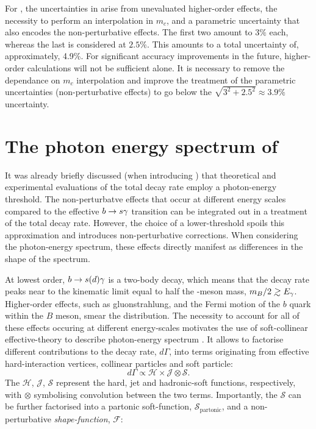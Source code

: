 For \BtoXsgamma, the uncertainties in  arise from unevaluated higher-order effects, the necessity to perform an interpolation in $m_c$, and a parametric uncertainty that also encodes the non-perturbative effects.
The first two amount to $3\%$ each, whereas the last is considered at $2.5\%$. 
This amounts to a total uncertainty of, approximately, 4.9\%.
For significant accuracy improvements in the future, higher-order calculations will not be sufficient alone.
It is necessary to remove the dependance on $m_c$ interpolation and improve the treatment of the parametric uncertainties (non-perturbative effects) to go below the $\sqrt{3^2+2.5^2}\approx3.9\%$ uncertainty.

\section{The photon energy spectrum of \texorpdfstring{\BtoXsdgamma}{B->Xsg}}\label{sec:btosgamma_spectrum_theory}

It was already briefly discussed (when introducing ) that theoretical and experimental evaluations of the total \BtoXsgamma decay rate employ a photon-energy threshold.
The non-perturbatve effects that occur at different energy scales compared to the effective $b\rightarrow s\gamma$ transition can be integrated out in a treatment of the total decay rate.
However, the choice of a lower-threshold spoils this approximation and introduces non-perturbative corrections.
When considering the photon-energy spectrum, these effects directly manifest as differences in the shape of the spectrum.

At lowest order, $b\rightarrow s(d) \gamma$ is a two-body decay, which means that the decay rate peaks near to the kinematic limit equal to half the \B-meson mass, $m_B/2\gsim E_{\g}$.
Higher-order effects, such as gluonstrahlung, and the Fermi motion of the $b$ quark within the $B$ meson, smear the distribution.
The necessity to account for all of these effects occuring at different energy-scales motivates the use of soft-collinear effective-theory to describe \BtoXsgamma photon-energy spectrum \cite{Neubert:2004qw,Ligeti:2008ac}.
It allows to factorise different contributions to the decay rate, $d\Gamma$, into terms originating from effective hard-interaction vertices, collinear particles and soft particle:
\begin{equation}\label{eq:differential_decay_rate_SCET}
    d\Gamma \propto \mathcal{H} \times \mathcal{J} \otimes \mathcal{S}.
\end{equation}
The $\mathcal{H}$, $\mathcal{J}$, $\mathcal{S}$ represent the hard, jet and hadronic-soft functions, respectively, with $\otimes$ symbolising convolution between the two terms.
Importantly, the $\mathcal{S}$ can be further factorised into a partonic soft-function, $\mathcal{S}_{\mathrm{partonic}}$, and a non-perturbative \textit{shape-function}, $\mathcal{F}$:

